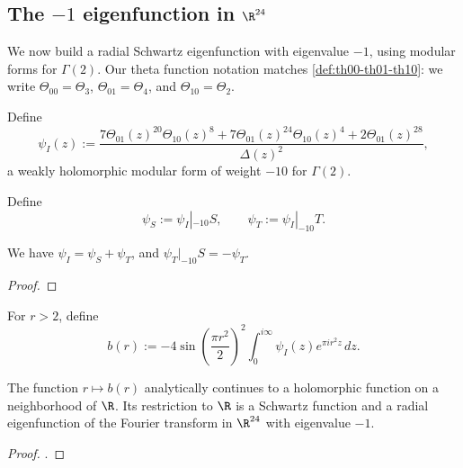 \subsection{The $-1$ eigenfunction in $\R^{24}$}

We now build a radial Schwartz eigenfunction with eigenvalue $-1$, using modular forms for $\Gamma(2)$.
Our theta function notation matches \cref{def:th00-th01-th10}: we write $\Theta_{00}=\Theta_3$, $\Theta_{01}=\Theta_4$, and $\Theta_{10}=\Theta_2$.

\begin{definition}\label{def:psiI-d24}\leanok
  Define
  \begin{equation}\label{eq:d24-psiIdef}
    \psi_I(z) := \frac{7 \Theta_{01}(z)^{20} \Theta_{10}(z)^8 + 7 \Theta_{01}(z)^{24} \Theta_{10}(z)^4 + 2 \Theta_{01}(z)^{28}}{\Delta(z)^2},
  \end{equation}
  a weakly holomorphic modular form of weight $-10$ for $\Gamma(2)$.
\end{definition}

\begin{definition}\label{def:psiS-psiT-d24}\leanok
  Define
  \[
    \psi_S := \psi_I|_{-10}S,\qquad \psi_T := \psi_I|_{-10}T.
  \]
\end{definition}

\begin{lemma}\label{lem:psi-relations-d24}\leanok
  We have $\psi_I=\psi_S+\psi_T$, and $\psi_T|_{-10}S=-\psi_T$.
\end{lemma}
\begin{proof}\leanok
\end{proof}

\begin{definition}\label{def:b-d24}\leanok
  For $r>2$, define
  \begin{equation}\label{eq:d24-bdef}
    b(r) := -4\sin\!\left(\frac{\pi r^2}{2}\right)^{\!2}\int_{0}^{i\infty}\psi_I(z)e^{\pi i r^2 z}\,dz.
  \end{equation}
\end{definition}

\begin{lemma}\label{lem:minusone-d24}\leanok
  The function $r\mapsto b(r)$ analytically continues to a holomorphic function on a neighborhood of $\R$.
  Its restriction to $\R$ is a Schwartz function and a radial eigenfunction of the Fourier transform in $\R^{24}$ with eigenvalue $-1$.
\end{lemma}
\begin{proof}\leanok.
\end{proof}

